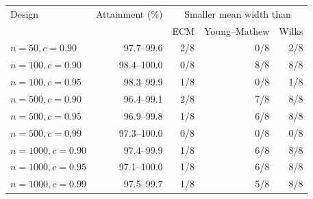 \begin{tabular}{@{}lrrrr@{}}
\toprule
Design & Attainment (\%) & \multicolumn{3}{c}{Smaller mean width than}\\
 & & ECM & Young--Mathew & Wilks\\
\midrule
\(n=50,c=0.90\) & 97.7--99.6 & 2/8 & 0/8 & 2/8\\
\(n=100,c=0.90\) & 98.4--100.0 & 0/8 & 8/8 & 8/8\\
\(n=100,c=0.95\) & 98.3--99.9 & 1/8 & 0/8 & 1/8\\
\(n=500,c=0.90\) & 96.4--99.1 & 2/8 & 7/8 & 8/8\\
\(n=500,c=0.95\) & 96.9--99.8 & 1/8 & 6/8 & 8/8\\
\(n=500,c=0.99\) & 97.3--100.0 & 0/8 & 0/8 & 0/8\\
\(n=1000,c=0.90\) & 97.4--99.9 & 1/8 & 6/8 & 8/8\\
\(n=1000,c=0.95\) & 97.1--100.0 & 1/8 & 6/8 & 8/8\\
\(n=1000,c=0.99\) & 97.5--99.7 & 1/8 & 5/8 & 8/8\\
\bottomrule
\end{tabular}
